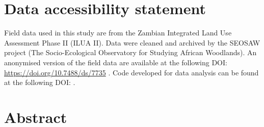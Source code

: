 \documentclass[11pt,a4paper]{article}
\begin{document}
\section*{Data accessibility statement}

Field data used in this study are from the Zambian Integrated Land Use
Assessment Phase II (ILUA II). Data were cleaned and archived by the SEOSAW
project (The Socio-Ecological Observatory for Studying African Woodlands). An
anonymised version of the field data are available at the following DOI:
\url{https://doi.org/10.7488/ds/7735} \citep{Godlee2024}. Code developed for
data analysis can be found at the following DOI: 
\url{} \citep{Godlee2024a}.

\newpage{}
\linenumbers

\section*{Abstract}
\end{document}
